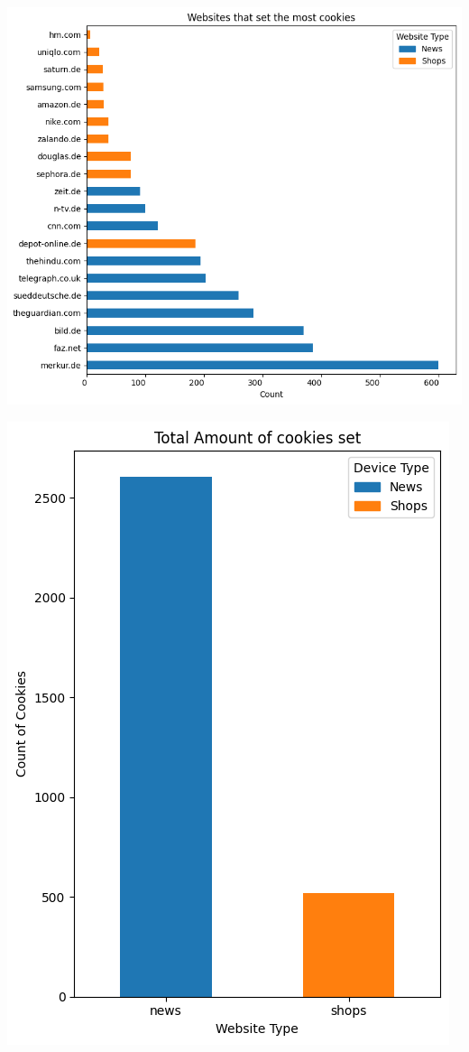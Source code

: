 \noindent 
\begin{minipage}{0.6    \textwidth} 
    \includegraphics[width=\linewidth]{./assets/comparison21.png}
\end{minipage}
\hfill 
\begin{minipage}{0.35\textwidth}
    \includegraphics[width=\linewidth]{./assets/comparison2.png}
\end{minipage}


